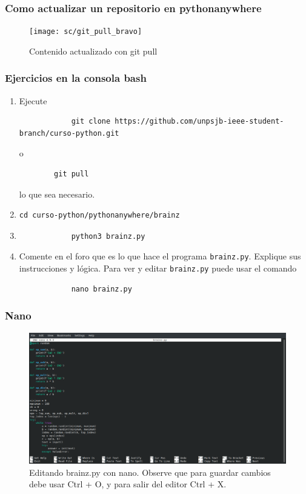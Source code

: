 \documentclass[11pt]{beamer}
\begin{document}
\begin{frame}
	\frametitle{Como actualizar un repositorio en pythonanywhere}
\begin{figure}
	\centering
	\texttt{[image: sc/git\_pull\_bravo]}
	\caption{Contenido actualizado con git pull}
	\label{fig:gitpullbravo}
\end{figure}
	
	
\end{frame}

\begin{frame}[fragile]
	\frametitle{Ejercicios en la consola bash}
	\begin{enumerate}
		\item Ejecute
		\begin{verbatim}
			git clone https://github.com/unpsjb-ieee-student-branch/curso-python.git
		\end{verbatim}
	    o
        \begin{verbatim}
	    git pull
        \end{verbatim}	    
        lo que sea necesario.
	    \item \begin{verbatim}cd curso-python/pythonanywhere/brainz\end{verbatim}
	    \item \begin{verbatim}
	    	python3 brainz.py
	    \end{verbatim}
        \item Comente en el foro que es lo que hace el programa \verb-brainz.py-. Explique sus instrucciones y lógica.
        Para ver y editar \verb-brainz.py- puede usar el comando
        \begin{verbatim}
        	nano brainz.py
        \end{verbatim}
       
	\end{enumerate}
\end{frame}
\begin{frame}
	\frametitle{Nano}
	
	\begin{figure}
		\centering
		\includegraphics[width=0.7\linewidth]{sc/nano_brainz.png}
		\caption{Editando brainz.py con nano. Observe que para guardar cambios debe usar Ctrl + O, y para salir del editor Ctrl + X.}
		\label{fig:nanobrainz}
	\end{figure}
	
\end{frame}
\end{document}
